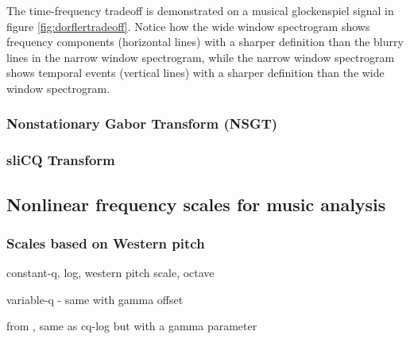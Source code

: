 \documentclass[report.tex]{subfiles}
\begin{document}
The time-frequency tradeoff is demonstrated on a musical glockenspiel signal in figure \ref{fig:dorflertradeoff}. Notice how the wide window spectrogram shows frequency components (horizontal lines) with a sharper definition than the blurry lines in the narrow window spectrogram, while the narrow window spectrogram shows temporal events (vertical lines) with a sharper definition than the wide window spectrogram.

\subsubsection{Nonstationary Gabor Transform (NSGT)}
\label{sec:theorynsgt}




\subsubsection{sliCQ Transform}
\label{sec:theoryslicq}



\vfill
\clearpage

\subsection{Nonlinear frequency scales for music analysis}
\label{sec:freqscales}


\subsubsection{Scales based on Western pitch}

constant-q, log, western pitch scale, octave

variable-q - same with gamma offset

from \cite{variableq1, variableq2}, same as cq-log but with a gamma parameter
\end{document}

